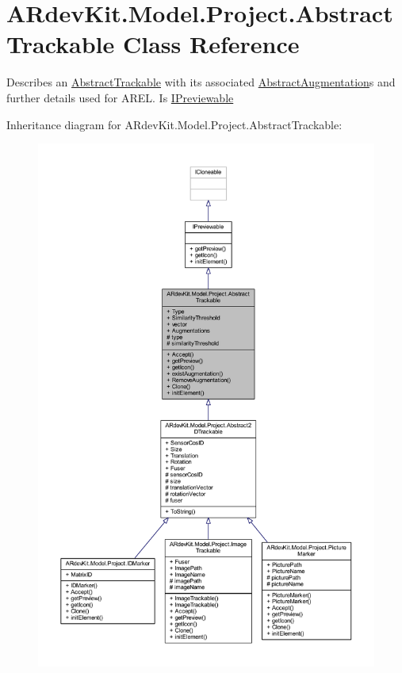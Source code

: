 \hypertarget{class_a_rdev_kit_1_1_model_1_1_project_1_1_abstract_trackable}{\section{A\-Rdev\-Kit.\-Model.\-Project.\-Abstract\-Trackable Class Reference}
\label{class_a_rdev_kit_1_1_model_1_1_project_1_1_abstract_trackable}
}


Describes an \hyperlink{class_a_rdev_kit_1_1_model_1_1_project_1_1_abstract_trackable}{Abstract\-Trackable} with its associated \hyperlink{class_a_rdev_kit_1_1_model_1_1_project_1_1_abstract_augmentation}{Abstract\-Augmentation}s and further details used for A\-R\-E\-L. Is \hyperlink{interface_a_rdev_kit_1_1_model_1_1_project_1_1_i_previewable}{I\-Previewable}  




Inheritance diagram for A\-Rdev\-Kit.\-Model.\-Project.\-Abstract\-Trackable\-:
\nopagebreak
\begin{figure}[H]
\begin{center}
\leavevmode
\includegraphics[width=350pt]{class_a_rdev_kit_1_1_model_1_1_project_1_1_abstract_trackable__inherit__graph}
\end{center}
\end{figure}


